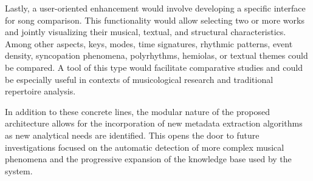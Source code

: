 Lastly, a user-oriented enhancement would involve developing a specific interface for song comparison. This functionality would allow selecting two or more works and jointly visualizing their musical, textual, and structural characteristics. Among other aspects, keys, modes, time signatures, rhythmic patterns, event density, syncopation phenomena, polyrhythms, hemiolas, or textual themes could be compared. A tool of this type would facilitate comparative studies and could be especially useful in contexts of musicological research and traditional repertoire analysis.

In addition to these concrete lines, the modular nature of the proposed architecture allows for the incorporation of new metadata extraction algorithms as new analytical needs are identified. This opens the door to future investigations focused on the automatic detection of more complex musical phenomena and the progressive expansion of the knowledge base used by the system.